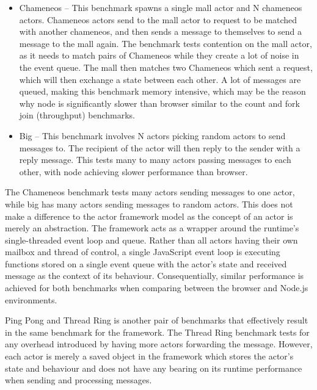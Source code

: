 \documentclass[12pt, a4paper]{report}
\theoremstyle{definition}
\theoremstyle{definition}%
\theoremstyle{definition}%
\theoremstyle{definition}%
\theoremstyle{definition}%
\theoremstyle{definition}%
\begin{document}
\begin{itemize}
    \item Chameneos – This benchmark spawns a single mall actor and N chameneos actors. Chameneos actors send to the mall actor to request to be matched with another chameneos, and then sends a message to themselves to send a message to the mall again. The benchmark tests contention on the mall actor, as it needs to match pairs of Chameneos while they create a lot of noise in the event queue. The mall then matches two Chameneos which sent a request, which will then exchange a state between each other. A lot of messages are queued, making this benchmark memory intensive, which may be the reason why node is significantly slower than browser similar to the count and fork join (throughput) benchmarks.
    \item Big – This benchmark involves N actors picking random actors to send messages to. The recipient of the actor will then reply to the sender with a reply message. This tests many to many actors passing messages to each other, with node achieving slower performance than browser.
\end{itemize}
The Chameneos benchmark tests many actors sending messages to one actor, while big has many actors sending messages to random actors. This does not make a difference to the actor framework model as the concept of an actor is merely an abstraction. The framework acts as a wrapper around the runtime's single-threaded event loop and queue. Rather than all actors having their own mailbox and thread of control, a single JavaScript event loop is executing functions stored on a single event queue with the actor's state and received message as the context of its behaviour. Consequentially, similar performance is achieved for both benchmarks when comparing between the browser and Node.js environments.

Ping Pong and Thread Ring is another pair of benchmarks that effectively result in the same benchmark for the framework. The Thread Ring benchmark tests for any overhead introduced by having more actors forwarding the message. However, each actor is merely a saved object in the framework which stores the actor's state and behaviour and does not have any bearing on its runtime performance when sending and processing messages.
\end{document}
